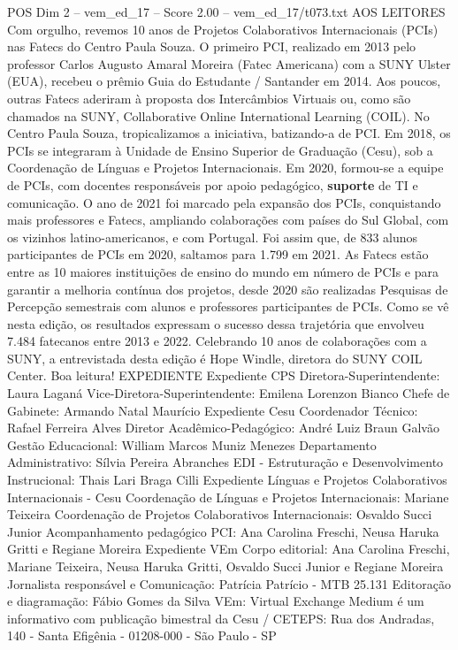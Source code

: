 \begin{textsample}{POS Dim 2 – vem\_ed\_17 – Score 2.00 – vem\_ed\_17/t073.txt}  \label{ex:f2_pos_127}
AOS LEITORES Com orgulho, revemos 10 anos de Projetos Colaborativos Internacionais (PCIs) nas Fatecs do Centro Paula Souza.
O primeiro PCI, realizado em 2013 pelo professor Carlos Augusto Amaral Moreira (Fatec Americana) com a SUNY Ulster (EUA), recebeu o prêmio Guia do Estudante / Santander em 2014.
Aos poucos, outras Fatecs aderiram à proposta dos Intercâmbios Virtuais ou, como são chamados na SUNY, Collaborative Online International Learning (COIL).
No Centro Paula Souza, tropicalizamos a iniciativa, batizando-a de PCI.
Em 2018, os PCIs se integraram à Unidade de Ensino Superior de Graduação (Cesu), sob a Coordenação de Línguas e Projetos Internacionais.
Em 2020, formou-se a equipe de PCIs, com docentes responsáveis por apoio pedagógico, \textbf{suporte} de TI e comunicação.
O ano de 2021 foi marcado pela expansão dos PCIs, conquistando mais professores e Fatecs, ampliando colaborações com países do Sul Global, com os vizinhos latino-americanos, e com Portugal.
Foi assim que, de 833 alunos participantes de PCIs em 2020, saltamos para 1.799 em 2021.
As Fatecs estão entre as 10 maiores instituições de ensino do mundo em número de PCIs e para garantir a melhoria contínua dos projetos, desde 2020 são realizadas Pesquisas de Percepção semestrais com alunos e professores participantes de PCIs.
Como se vê nesta edição, os resultados expressam o sucesso dessa trajetória que envolveu 7.484 fatecanos entre 2013 e 2022.
Celebrando 10 anos de colaborações com a SUNY, a entrevistada desta edição é Hope Windle, diretora do SUNY COIL Center.
Boa leitura!
EXPEDIENTE Expediente CPS Diretora-Superintendente: Laura Laganá Vice-Diretora-Superintendente: Emilena Lorenzon Bianco Chefe de Gabinete: Armando Natal Maurício Expediente Cesu Coordenador Técnico: Rafael Ferreira Alves Diretor Acadêmico-Pedagógico: André Luiz Braun Galvão Gestão Educacional: William Marcos Muniz Menezes Departamento Administrativo: Sílvia Pereira Abranches EDI - Estruturação e Desenvolvimento Instrucional: Thais Lari Braga Cilli Expediente Línguas e Projetos Colaborativos Internacionais - Cesu Coordenação de Línguas e Projetos Internacionais: Mariane Teixeira Coordenação de Projetos Colaborativos Internacionais: Osvaldo Succi Junior Acompanhamento pedagógico PCI: Ana Carolina Freschi, Neusa Haruka Gritti e Regiane Moreira Expediente VEm Corpo editorial: Ana Carolina Freschi, Mariane Teixeira, Neusa Haruka Gritti, Osvaldo Succi Junior e Regiane Moreira Jornalista responsável e Comunicação: Patrícia Patrício - MTB 25.131 Editoração e diagramação: Fábio Gomes da Silva VEm: Virtual Exchange Medium é um informativo com publicação bimestral da Cesu / CETEPS: Rua dos Andradas, 140 - Santa Efigênia - 01208-000 - São Paulo - SP

\end{textsample}
